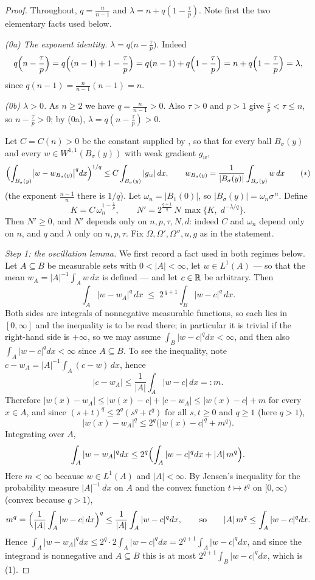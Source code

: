 \begin{proof}
Throughout, $q=\frac n{n-1}$ and $\lambda=n+q(1-\frac\tau p)$.  Note first the
two elementary facts used below.

\emph{(0a) The exponent identity.}  $\lambda=q\bigl(n-\frac\tau p\bigr)$.
Indeed
\[
q\Bigl(n-\frac\tau p\Bigr)
=q\Bigl((n-1)+1-\frac\tau p\Bigr)
=q(n-1)+q\Bigl(1-\frac\tau p\Bigr)
=n+q\Bigl(1-\frac\tau p\Bigr)=\lambda ,
\]
since $q(n-1)=\frac n{n-1}(n-1)=n$.

\emph{(0b) $\lambda>0$.}  As $n\ge2$ we have $q=\frac n{n-1}>0$.  Also
$\tau>0$ and $p>1$ give $\frac\tau p<\tau\le n$, so $n-\frac\tau p>0$; by (0a),
$\lambda=q(n-\frac\tau p)>0$.

Let $C=C(n)>0$ be the constant supplied by
, so that for every ball $B_\sigma(y)$ and
every $w\in W^{1,1}(B_\sigma(y))$ with weak gradient $g_w$,
\[
\Bigl(\int_{B_\sigma(y)}\bigl|w-w_{B_\sigma(y)}\bigr|^{q}dx\Bigr)^{1/q}
\le C\int_{B_\sigma(y)}|g_w|\,dx ,
\qquad
w_{B_\sigma(y)}=\frac1{|B_\sigma(y)|}\int_{B_\sigma(y)}w\,dx
\tag{$*$}
\]
(the exponent $\frac{n-1}n$ there is $1/q$).  Let $\omega_n=|B_1(0)|$, so
$|B_\sigma(y)|=\omega_n\sigma^{\,n}$.  Define
\[
K=C\,\omega_n^{1-\frac1p},
\qquad
N'=2^{\frac{q+1}q}\,N\,\max\bigl\{K,\;d^{-\lambda/q}\bigr\} .
\]
Then $N'\ge0$, and $N'$ depends only on $n,p,\tau,N,d$: indeed $C$ and
$\omega_n$ depend only on $n$, and $q$ and $\lambda$ only on $n,p,\tau$.  Fix
$\Omega,\Omega',\Omega'',u,g$ as in the statement.

\emph{Step 1: the oscillation lemma.}  We first record a fact used in both
regimes below.  Let $A\subseteq B$ be measurable sets with $0<|A|<\infty$, let
$w\in L^1(A)$ --- so that the mean $w_A=|A|^{-1}\int_Aw\,dx$ is defined --- and
let $c\in\mathbb{R}$ be arbitrary.  Then
\[
\int_A|w-w_A|^{q}\,dx\;\le\;2^{\,q+1}\int_B|w-c|^{q}\,dx .
\tag{1}
\]
Both sides are integrals of nonnegative measurable functions, so each lies in
$[0,\infty]$ and the inequality is to be read there; in particular it is trivial
if the right-hand side is $+\infty$, so we may assume
$\int_B|w-c|^{q}dx<\infty$, and then also $\int_A|w-c|^{q}dx<\infty$ since
$A\subseteq B$.  To see the inequality, note $c-w_A=|A|^{-1}\int_A(c-w)\,dx$,
hence
\[
|c-w_A|\le\frac1{|A|}\int_A|w-c|\,dx=:m .
\]
Therefore $|w(x)-w_A|\le|w(x)-c|+|c-w_A|\le|w(x)-c|+m$ for every $x\in A$, and
since $(s+t)^q\le2^q(s^q+t^q)$ for all $s,t\ge0$ and $q\ge1$ (here $q>1$),
\[
|w(x)-w_A|^{q}\le2^{q}\bigl(|w(x)-c|^{q}+m^{q}\bigr).
\]
Integrating over $A$,
\[
\int_A|w-w_A|^{q}dx\le2^{q}\Bigl(\int_A|w-c|^{q}dx+|A|\,m^{q}\Bigr).
\]
Here $m<\infty$ because $w\in L^1(A)$ and $|A|<\infty$.  By Jensen's inequality
for the probability measure $|A|^{-1}\,dx$ on $A$ and the convex function
$t\mapsto t^{q}$ on $[0,\infty)$ (convex because $q>1$),
\[
m^{q}=\Bigl(\frac1{|A|}\int_A|w-c|\,dx\Bigr)^{q}
\le\frac1{|A|}\int_A|w-c|^{q}dx ,
\qquad\text{so}\qquad
|A|\,m^{q}\le\int_A|w-c|^{q}dx .
\]
Hence $\int_A|w-w_A|^{q}dx\le2^{q}\cdot2\int_A|w-c|^{q}dx=2^{q+1}\int_A|w-c|^{q}dx$,
and since the integrand is nonnegative and $A\subseteq B$ this is at most
$2^{q+1}\int_B|w-c|^{q}dx$, which is (1).


\end{proof}
